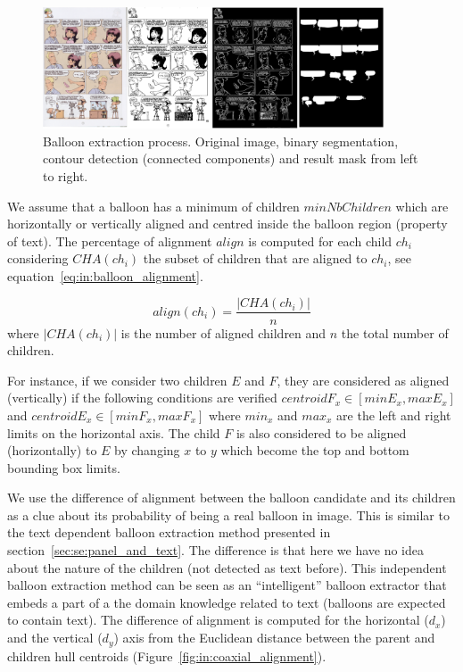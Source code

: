  \begin{figure}[!ht]  %
   \centering
  \includegraphics[width=0.9\textwidth]{closed_balloon_process.png}
  \caption[Balloon extraction process]{Balloon extraction process. Original image, binary segmentation, contour detection (connected components) and result mask from left to right.}
  \label{fig:in:balloon_binarisation}
 \end{figure}

We assume that a balloon has a minimum of children $minNbChildren$ which are horizontally or vertically aligned and centred inside the balloon region (property of text).
The percentage of alignment $align$ is computed for each child $ch_i$ considering $CHA(ch_i)$ the subset of children that are aligned to $ch_i$, see equation~\ref{eq:in:balloon_alignment}.

\begin{equation}
	\label{eq:in:balloon_alignment}
	align(ch_i) = \frac{|CHA(ch_i)|}{n}
\end{equation}
where $|CHA(ch_i)|$ is the number of aligned children and $n$ the total number of children.


For instance, if we consider two children $E$ and $F$, they are considered as aligned (vertically) if the following conditions are verified $centroidF_x \in [minE_x, maxE_x]$ and $centroidE_x \in [minF_x, maxF_x]$ where $min_x$ and $max_x$ are the left and right limits on the horizontal axis.
The child $F$ is also considered to be aligned (horizontally) to $E$ by changing $x$ to $y$ which become the top and bottom bounding box limits.

We use the difference of alignment between the balloon candidate and its children as a clue about its probability of being a real balloon in image.
This is similar to the text dependent balloon extraction method presented in section~\ref{sec:se:panel_and_text}.
The difference is that here we have no idea about the nature of the children (not detected as text before).
This independent balloon extraction method can be seen as an ``intelligent'' balloon extractor that embeds a part of a the domain knowledge related to text (balloons are expected to contain text).
The difference of alignment is computed for the horizontal ($d_x$) and the vertical ($d_y$) axis from the Euclidean distance between the parent and children hull centroids (Figure~\ref{fig:in:coaxial_alignment}).


